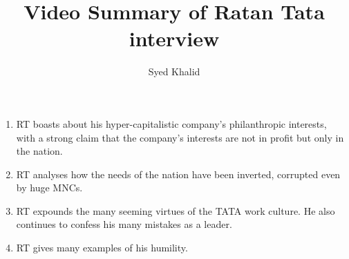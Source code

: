 \documentclass{article}
\title{\textbf{Video Summary of Ratan Tata interview}}
\author{Syed Khalid}
\begin{document}
\maketitle
\begin{enumerate}
  \item RT boasts about his hyper-capitalistic company's philanthropic interests, with a strong claim that the company's interests are not in profit but only in the nation.
  \item RT analyses how the needs of the nation have been inverted, corrupted even by huge MNCs.
  \item RT expounds the many seeming virtues of the TATA work culture. He also continues to confess his many mistakes as a leader. 
  \item RT gives many examples of his humility.
\end{enumerate}
\end{document}
